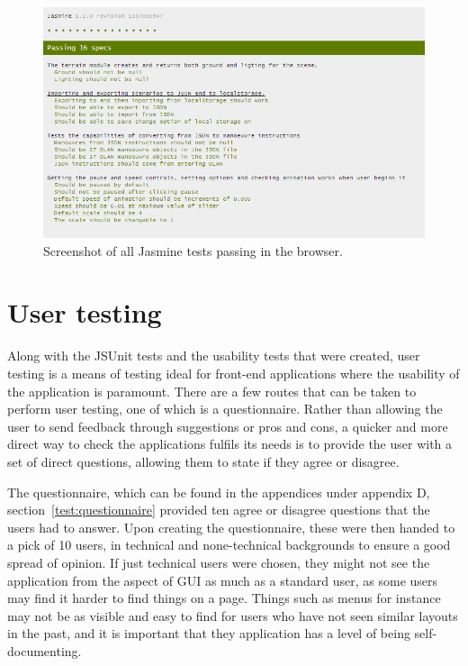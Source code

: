 \begin{figure}[h!]
  \centering
      \includegraphics[width=1\textwidth]{images/jasmine.png}
  \caption{Screenshot of all Jasmine tests passing in the browser.}
  \label{fig:jasmine}
\end{figure}

\clearpage

\section{User testing}
Along with the JSUnit tests and the usability tests that were created, user testing is a means of testing ideal for front-end applications where the usability of the application is paramount. There are a few routes that can be taken to perform user testing, one of which is a questionnaire. Rather than allowing the user to send feedback through suggestions or pros and cons, a quicker and more direct way to check the applications fulfils its needs is to provide the user with a set of direct questions, allowing them to state if they agree or disagree.

The questionnaire, which can be found in the appendices under appendix D, section~\ref{test:questionnaire} provided ten agree or disagree questions that the users had to answer. Upon creating the questionnaire, these were then handed to a pick of 10 users, in technical and none-technical backgrounds to ensure a good spread of opinion. If just technical users were chosen, they might not see the application from the aspect of GUI as much as a standard user, as some users may find it harder to find things on a page. Things such as menus for instance may not be as visible and easy to find for users who have not seen similar layouts in the past, and it is important that they application has a level of being self-documenting.

